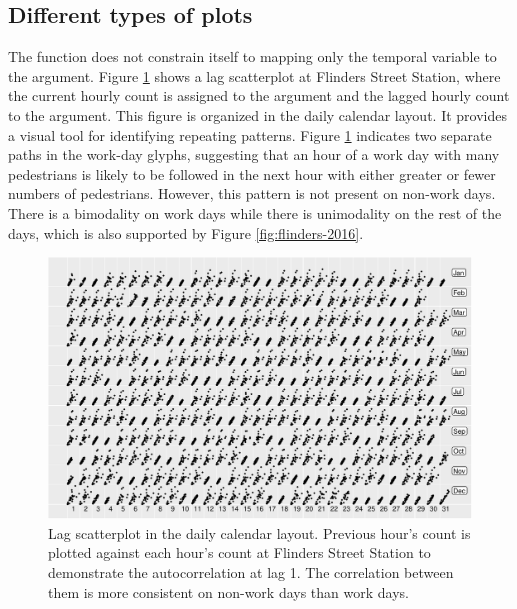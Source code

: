 \documentclass[article]{jss}
\theoremstyle{definition}
\theoremstyle{definition}
\theoremstyle{remark}
\begin{document}
\subsection{Different types of plots}\label{different-types-of-plots}

The  function does not constrain itself to mapping
only the temporal variable to the  argument. Figure
\ref{fig:scatterplot} shows a lag scatterplot at Flinders Street
Station, where the current hourly count is assigned to the 
argument and the lagged hourly count to the  argument. This
figure is organized in the daily calendar layout. It provides a visual
tool for identifying repeating patterns. Figure \ref{fig:scatterplot}
indicates two separate paths in the work-day glyphs, suggesting that an
hour of a work day with many pedestrians is likely to be followed in the
next hour with either greater or fewer numbers of pedestrians. However,
this pattern is not present on non-work days. There is a bimodality on
work days while there is unimodality on the rest of the days, which is
also supported by Figure \ref{fig:flinders-2016}.

\begin{CodeChunk}
\begin{figure}

{\centering \includegraphics[width=\textwidth]{figure/scatterplot-1} 

}

\caption[Lag scatterplot in the daily calendar layout.
Previous hour's count is plotted against each hour's count at Flinders
Street Station to demonstrate the autocorrelation at lag 1. The
correlation between them is more consistent on non-work days than work
days.]{Lag scatterplot in the daily calendar layout.
Previous hour's count is plotted against each hour's count at Flinders
Street Station to demonstrate the autocorrelation at lag 1. The
correlation between them is more consistent on non-work days than work
days.}\label{fig:scatterplot}
\end{figure}
\end{CodeChunk}
\end{document}

